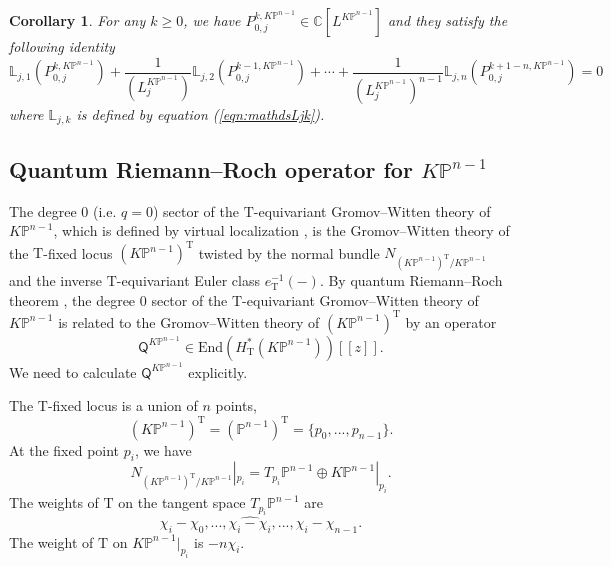 \documentclass[12pt]{amsart}
\newtheorem{cor}[prop]{Corollary}
\numberwithin{equation}{section}
\newcommand{\KP}{K\mathbb{P}}
\begin{document}
\begin{cor}\label{cor:polynomiality_of_P_0j_KP}
 For any $k\geq 0$, we have $P_{0,j}^{k,\KP^{n-1}}\in\mathbb{C}[L^{\KP^{n-1}}]$ and they satisfy the following identity
\begin{equation}\label{eqn:P0jk_satisfying_mathdsLjk_equation}
\mathds{L}_{j,1}(P_{0,j}^{k,\KP^{n-1}})+\frac{1}{(L_j^{K\mathbb{P}^{n-1}})}\mathds{L}_{j,2}(P_{0,j}^{k-1,\KP^{n-1}})+\cdots+\frac{1}{(L_j^{K\mathbb{P}^{n-1}})^{n-1}}\mathds{L}_{j,n}(P_{0,j}^{k+1-n,\KP^{n-1}})=0
\end{equation}
where $\mathds{L}_{j,k}$ is defined by equation (\ref{eqn:mathdsLjk}).
\end{cor}



\subsection{Quantum Riemann--Roch operator for \texorpdfstring{$K\mathbb{P}^{n-1}$}{KP{n-1}}}\label{sec:QRRKP}
The degree $0$ (i.e. $q=0$) sector of the $\mathrm{T}$-equivariant Gromov--Witten theory of $\KP^{n-1}$, which is defined by virtual localization \cite{grpan}, is the Gromov--Witten theory of the $\mathrm{T}$-fixed locus $(\KP^{n-1})^{\mathrm{T}}$ twisted by the normal bundle $N_{(\KP^{n-1})^{\mathrm{T}}/\KP^{n-1}}$ and the inverse $\mathrm{T}$-equivariant Euler class $e_{\mathrm{T}}^{-1}(-)$. By quantum Riemann--Roch theorem \cite{cg}, the degree $0$ sector of the $\mathrm{T}$-equivariant Gromov--Witten theory of $\KP^{n-1}$ is related to the Gromov--Witten theory of $(\KP^{n-1})^{\mathrm{T}}$ by an operator 
$$\mathsf{Q}^{\KP^{n-1}}\in \text{End}(H^*_{\mathrm{T}}(\KP^{n-1}))[\![z]\!].$$ 
We need to calculate $\mathsf{Q}^{\KP^{n-1}}$ explicitly. 

The $\mathrm{T}$-fixed locus is a union of $n$ points,
$$(\KP^{n-1})^{\mathrm{T}}=(\mathbb{P}^{n-1})^{\mathrm{T}}=\{p_0,...,p_{n-1}\}.$$
At the fixed point $p_i$, we have $$N_{(\KP^{n-1})^{\mathrm{T}}/\KP^{n-1}}|_{p_i}=T_{p_i}\mathbb{P}^{n-1}\oplus \KP^{n-1}|_{p_i}.$$
The weights of $\mathrm{T}$ on the tangent space $T_{p_i}\mathbb{P}^{n-1}$ are
\begin{equation*}
    \chi_i-\chi_0,...,\widehat{\chi_i-\chi_i},..., \chi_i-\chi_{n-1}.
\end{equation*}
The weight of $\mathrm{T}$ on $\KP^{n-1}|_{p_i}$ is $-n\chi_i$.
\end{document}
